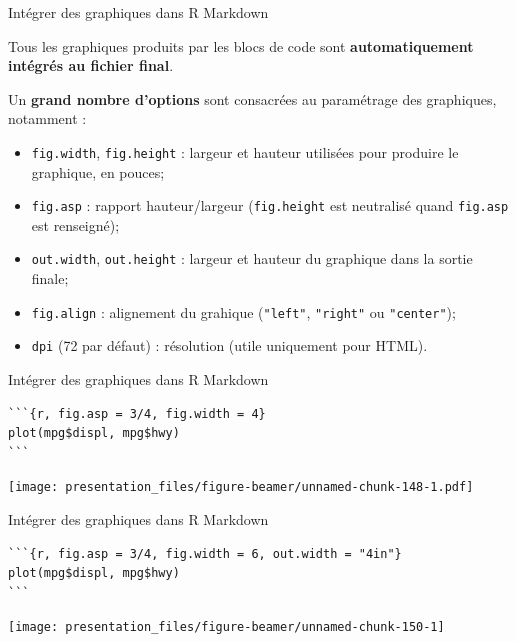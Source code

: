 \documentclass[12pt,ignorenonframetext,handout,]{beamer}
\providecommand{\tightlist}{%
  \setlength{\itemsep}{0pt}\setlength{\parskip}{0pt}}
\begin{document}
\begin{frame}[fragile]{Intégrer des graphiques dans R Markdown}
\protect\hypertarget{integrer-des-graphiques-dans-r-markdown}{}

Tous les graphiques produits par les blocs de code sont
\textbf{automatiquement intégrés au fichier final}.

\pause Un \textbf{grand nombre d’options} sont consacrées au paramétrage
des graphiques, notamment :

\begin{itemize}
\tightlist
\item
  \texttt{fig.width}, \texttt{fig.height} : largeur et hauteur utilisées
  pour produire le graphique, en pouces;
\item
  \texttt{fig.asp} : rapport hauteur/largeur (\texttt{fig.height} est
  neutralisé quand \texttt{fig.asp} est renseigné);
\item
  \texttt{out.width}, \texttt{out.height} : largeur et hauteur du
  graphique dans la sortie finale;
\item
  \texttt{fig.align} : alignement du grahique (\texttt{"left"},
  \texttt{"right"} ou \texttt{"center"});
\item
  \texttt{dpi} (72 par défaut) : résolution (utile uniquement pour
  HTML).
\end{itemize}

\end{frame}

\begin{frame}[fragile]{Intégrer des graphiques dans R Markdown}
\protect\hypertarget{integrer-des-graphiques-dans-r-markdown-1}{}

\footnotesize \center

\begin{verbatim}
```{r, fig.asp = 3/4, fig.width = 4}
plot(mpg$displ, mpg$hwy)
```
\end{verbatim}

\texttt{[image: presentation\_files/figure-beamer/unnamed-chunk-148-1.pdf]}

\end{frame}

\begin{frame}[fragile]{Intégrer des graphiques dans R Markdown}
\protect\hypertarget{integrer-des-graphiques-dans-r-markdown-2}{}

\footnotesize \center

\begin{verbatim}
```{r, fig.asp = 3/4, fig.width = 6, out.width = "4in"}
plot(mpg$displ, mpg$hwy)
```
\end{verbatim}

\texttt{[image: presentation\_files/figure-beamer/unnamed-chunk-150-1]}

\end{frame}
\end{document}
